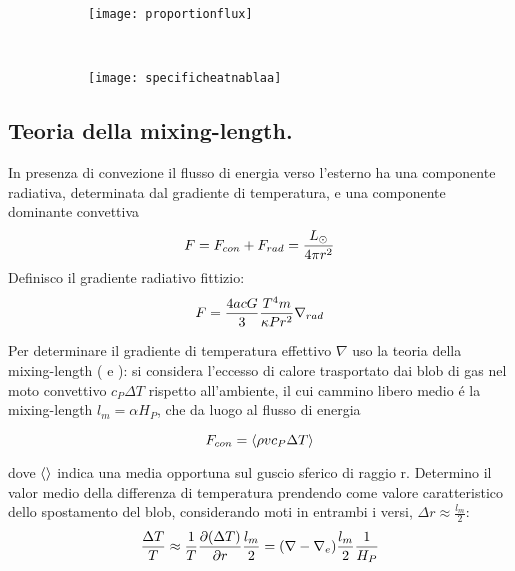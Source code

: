 \documentclass[../main.tex]{subfiles}
\begin{document}
\begin{figure}[!h]
\begin{subfigure}[l]{0.55\textwidth}
    \texttt{[image: proportionflux]}
    \label{fluxproportion}
\end{subfigure}
~
\begin{subfigure}[r]{0.4\textwidth}
\centering
\texttt{[image: specificheatnablaa]}
\end{subfigure}
    
\end{figure}


\subsection{Teoria della mixing-length.}

In presenza di convezione il flusso di energia verso l'esterno ha una componente radiativa, determinata dal gradiente di temperatura, e una componente dominante convettiva 
\begin{equation}
F=F_{con}+F_{rad}=\frac{\lsun{}}{4\pi r^2}
\end{equation}
Definisco il gradiente radiativo fittizio:
\begin{equation}
F=\frac{4acG}{3}\frac{T^4m}{\kappa Pr^2}\nrad{}\label{eq:fictionrad}
\end{equation}

Per determinare il gradiente di temperatura effettivo $\nabla$ uso la teoria della mixing-length (\cite{prandtl25tur} e \cite{vitense53kon}):
si considera l'eccesso di calore trasportato dai blob di gas nel moto convettivo $c_P\Delta T$ rispetto all'ambiente, il cui cammino libero medio \'e la mixing-length $l_m=\alpha H_P$, che da luogo al flusso di energia

\begin{equation}
F_{con}=\exv{\rho vc_P\Delta T}\label{eq:convectiveflux}
\end{equation}

dove $\exv{}$ indica una media opportuna sul guscio sferico di raggio r. Determino il valor medio della differenza di temperatura prendendo come valore caratteristico dello spostamento del blob, considerando moti in entrambi i versi, $\Delta r\approx\frac{l_m}{2}$:
\begin{equation}
\frac{\Delta T}{T}\approx\frac{1}{T}\PDy{r}{(\Delta T)}\frac{l_m}{2}=(\nabla-\nabla_e)\frac{l_m}{2}\frac{1}{H_P}
\end{equation}
\end{document}
